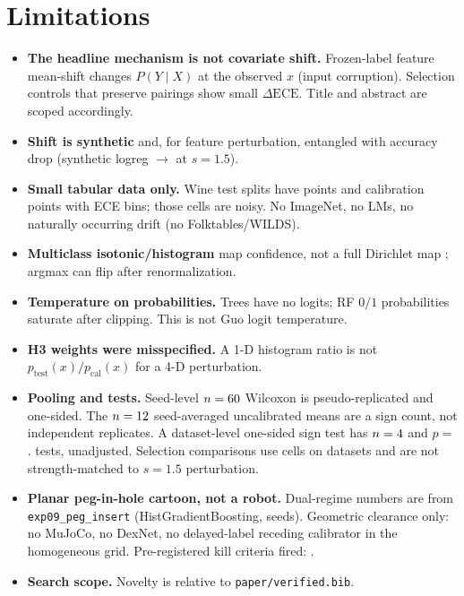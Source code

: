 \documentclass[10pt,twocolumn]{article}
\begin{document}
\section{Limitations}
\begin{itemize}
\item \textbf{The headline mechanism is not covariate shift.} Frozen-label
feature mean-shift changes $P(Y\mid X)$ at the observed $x$ (input
corruption). Selection controls that preserve pairings show small
$\Delta\mathrm{ECE}$. Title and abstract are scoped accordingly.
\item \textbf{Shift is synthetic} and, for feature perturbation, entangled
with accuracy drop (synthetic logreg
\NumSynthLogregAccIid$\to$\NumSynthLogregAccShifted{} at $s{=}1.5$).
\item \textbf{Small tabular data only.} Wine test splits have
\NumWineNTest{} points and \NumWineNCal{} calibration points with
\NumEceBins{} ECE bins; those cells are noisy. No ImageNet, no LMs,
no naturally occurring drift (no Folktables/WILDS).
\item \textbf{Multiclass isotonic/histogram} map confidence, not a full
Dirichlet map \cite{kull2019dirichlet}; argmax can flip after
renormalization.
\item \textbf{Temperature on probabilities.} Trees have no logits; RF
$0/1$ probabilities saturate after clipping. This is not Guo logit
temperature.
\item \textbf{H3 weights were misspecified.} A 1-D histogram ratio is not
$p_{\mathrm{test}}(x)/p_{\mathrm{cal}}(x)$ for a 4-D perturbation.
\item \textbf{Pooling and tests.} Seed-level $n=60$ Wilcoxon is
pseudo-replicated and one-sided. The $n=12$ seed-averaged
uncalibrated means are a sign count, not independent replicates. A
dataset-level one-sided sign test has $n=4$ and
$p{=}$\NumDatasetSignP. \NumNTests{} tests, unadjusted. Selection
comparisons use \NumExpFiveN{} cells on \NumExpFiveNDs{} datasets and
are not strength-matched to $s{=}1.5$ perturbation.
\item \textbf{Planar peg-in-hole cartoon, not a robot.} Dual-regime
numbers are from \texttt{exp09\_peg\_insert} (HistGradientBoosting,
\NumDualNSeeds{} seeds). Geometric clearance only: no MuJoCo, no DexNet,
no delayed-label receding calibrator in the homogeneous grid. Pre-registered
kill criteria fired: \texttt{\NumDualKillsFired}.
\item \textbf{Search scope.} Novelty is relative to
\texttt{paper/verified.bib}.
\end{itemize}
\end{document}
